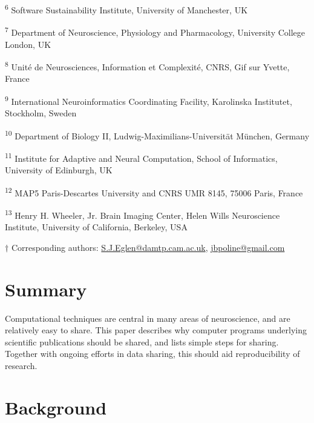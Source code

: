 \documentclass[11pt]{article}
\begin{document}
\noindent \textsuperscript{6}
Software Sustainability Institute, University of Manchester, UK

\noindent \textsuperscript{7}
Department of Neuroscience, Physiology and Pharmacology, 
University College London, UK


\noindent \textsuperscript{8}
Unit\'{e} de Neurosciences, Information et Complexit\'{e}, CNRS, Gif sur Yvette, France


\noindent \textsuperscript{9}
International Neuroinformatics Coordinating Facility, 
Karolinska Institutet, Stockholm, Sweden

\noindent \textsuperscript{10}
Department of Biology II, Ludwig-Maximilians-Universit\"{a}t
M\"{u}nchen, Germany

\noindent \textsuperscript{11}
Institute for Adaptive and Neural Computation, 
School of Informatics, University of Edinburgh, UK


\noindent \textsuperscript{12} MAP5 Paris-Descartes University and CNRS UMR 8145, 
75006 Paris, France

\noindent \textsuperscript{13}  Henry H. Wheeler, Jr. Brain Imaging Center, Helen Wills Neuroscience Institute, University of California, Berkeley, USA

\vspace*{2mm}
\noindent $\dagger$
Corresponding authors: \url{S.J.Eglen@damtp.cam.ac.uk}, \url{jbpoline@gmail.com}

\clearpage



\renewcommand{\cite}[1]{\autocite{#1}}


\section*{Summary}
  Computational techniques are central in many areas of neuroscience,
  and are relatively easy to share.  This paper describes why computer
  programs underlying scientific publications should be shared, and
  lists simple steps for sharing.  Together with ongoing efforts in
  data sharing, this should aid reproducibility of research.


\section*{Background}
\end{document}
